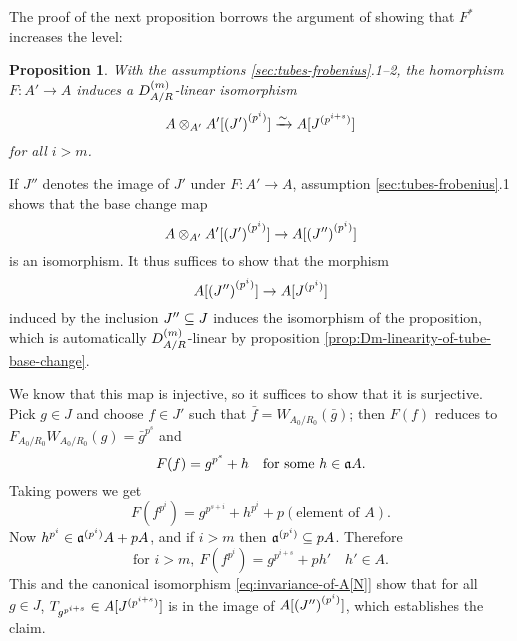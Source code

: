 \documentclass{article}
\theoremstyle{change}
\newtheorem{prop}[subsubsection]{Proposition}
\numberwithin{equation}{subsubsection}
\newcommand{\demobox}{\vrule height6pt width6pt depth0pt}
\newenvironment{demo}{\noindent{\it Proof.}}
{{\unskip\nobreak\hfil\qquad
\demobox\parfillskip=0pt\par}
\medskip}
\begin{document}
The proof of the next proposition borrows the argument of
\cite[\S2.2]{berthelot:2000} showing that $F^*$ increases the level:

\begin{prop}\label{prop:Frobenius-and-tubes}
  With the assumptions \ref{sec:tubes-frobenius}.1--2, the homorphism
  $F:A'\to A$ induces a ${D}^{({m})}_{A/R}$-linear isomorphism
  \begin{displaymath}
    A\otimes_{A'}A'[{(J')}^{({p^i})}]\xrightarrow{\sim} A[{J}^{({p^{i+s}})}]  
  \end{displaymath}
  for all $i>m$.
\end{prop}
\begin{demo}
  If $J''$ denotes the image of $J'$ under $F:A'\to A$, assumption
  \ref{sec:tubes-frobenius}.1 shows that the base change map
  \begin{displaymath}
    A\otimes_{A'}A'[{(J')}^{({p^i})}]\to A[{(J'')}^{({p^i})}]
  \end{displaymath}
  is an isomorphism. It thus suffices to show that the
  morphism
  \begin{displaymath}
    A[{(J'')}^{({p^i})}]\to A[{J}^{({p^i})}]
  \end{displaymath}
  induced by the inclusion $J''\subseteq J$ induces the isomorphism of the
  proposition, which is automatically ${D}^{({m})}_{A/R}$-linear by
  proposition \ref{prop:Dm-linearity-of-tube-base-change}.

  We know that this map is injective, so it suffices to show that it
  is surjective. Pick $g\in J$ and choose $f\in J'$ such that
  $\bar f=W_{A_0/R_0}(\bar g)$; then $F(f)$ reduces to
  $F_{A_0/R_0}W_{A_0/R_0}(g)=\bar g^{p^s}$ and
  \begin{displaymath}
    F(f)=g^{p^s}+h\quad\text{for some}\ h\in\fa A.
  \end{displaymath}
  Taking powers we get
  \begin{displaymath}
    F(f^{p^i})=g^{p^{s+i}}+h^{p^i}+p(\text{element of $A$}).
  \end{displaymath}
  Now $h^{p^i}\in{{\mathfrak a}}^{({p^i})}A+pA$, and if $i>m$ then
  ${{\mathfrak a}}^{({p^i})}\subseteq pA$. Therefore
  \begin{displaymath}
    \text{for $i>m$},\ F(f^{p^i})=g^{p^{i+s}}+ph'\quad h'\in A.
  \end{displaymath}
  This and the canonical isomorphism \ref{eq:invariance-of-A[N]} show
  that for all $g\in J$, $T_{g^{p^{i+s}}}\in A[{J}^{({p^{i+s}})}]$ is
  in the image of $A[{(J'')}^{({p^i})}]$, which establishes the claim.
\end{demo}
\end{document}
